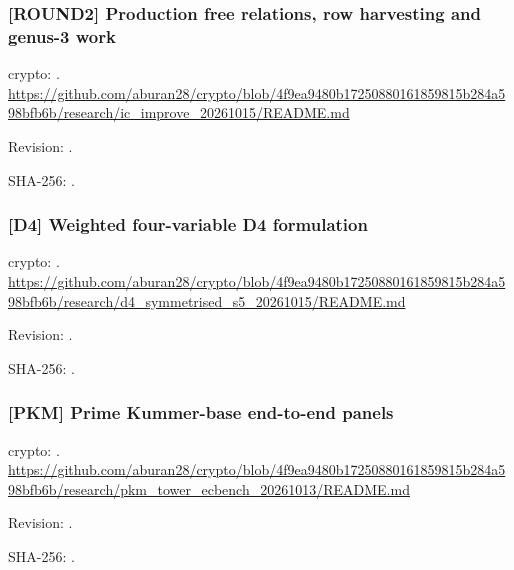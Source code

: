\par\noindent\begin{minipage}{\linewidth}\small
\subsubsection*{[ROUND2] Production free relations, row harvesting and genus-3 work}\label{art:ROUND2}
crypto: .
\url{https://github.com/aburan28/crypto/blob/4f9ea9480b17250880161859815b284a598bfb6b/research/ic_improve_20261015/README.md}
\par Revision: .
\par SHA-256: .
\end{minipage}\par\medskip

\par\noindent\begin{minipage}{\linewidth}\small
\subsubsection*{[D4] Weighted four-variable D4 formulation}\label{art:D4}
crypto: .
\url{https://github.com/aburan28/crypto/blob/4f9ea9480b17250880161859815b284a598bfb6b/research/d4_symmetrised_s5_20261015/README.md}
\par Revision: .
\par SHA-256: .
\end{minipage}\par\medskip

\par\noindent\begin{minipage}{\linewidth}\small
\subsubsection*{[PKM] Prime Kummer-base end-to-end panels}\label{art:PKM}
crypto: .
\url{https://github.com/aburan28/crypto/blob/4f9ea9480b17250880161859815b284a598bfb6b/research/pkm_tower_ecbench_20261013/README.md}
\par Revision: .
\par SHA-256: .
\end{minipage}\par\medskip

